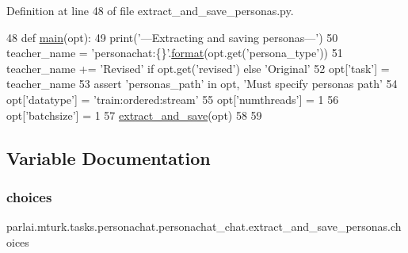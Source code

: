 Definition at line 48 of file extract\+\_\+and\+\_\+save\+\_\+personas.\+py.


\begin{DoxyCode}
48 \textcolor{keyword}{def }\hyperlink{namespacepersonachat__eval_1_1extract__and__save__personas_aa39f496bc78dfa28c1fbc2c4129a915c}{main}(opt):
49     print(\textcolor{stringliteral}{'---Extracting and saving personas---'})
50     teacher\_name = \textcolor{stringliteral}{'personachat:\{\}'}.\hyperlink{namespaceparlai_1_1chat__service_1_1services_1_1messenger_1_1shared__utils_a32e2e2022b824fbaf80c747160b52a76}{format}(opt.get(\textcolor{stringliteral}{'persona\_type'}))
51     teacher\_name += \textcolor{stringliteral}{'Revised'} \textcolor{keywordflow}{if} opt.get(\textcolor{stringliteral}{'revised'}) \textcolor{keywordflow}{else} \textcolor{stringliteral}{'Original'}
52     opt[\textcolor{stringliteral}{'task'}] = teacher\_name
53     \textcolor{keyword}{assert} \textcolor{stringliteral}{'personas\_path'} \textcolor{keywordflow}{in} opt, \textcolor{stringliteral}{'Must specify personas path'}
54     opt[\textcolor{stringliteral}{'datatype'}] = \textcolor{stringliteral}{'train:ordered:stream'}
55     opt[\textcolor{stringliteral}{'numthreads'}] = 1
56     opt[\textcolor{stringliteral}{'batchsize'}] = 1
57     \hyperlink{namespacepersonachat__eval_1_1extract__and__save__personas_a7bae99c34a0b3f49cbce1328146926fd}{extract\_and\_save}(opt)
58 
59 
\end{DoxyCode}


\subsection{Variable Documentation}
\mbox{\label{namespaceparlai_1_1mturk_1_1tasks_1_1personachat_1_1personachat__chat_1_1extract__and__save__personas_a2def58d59437334ec072a3d644c0a577}} 
\subsubsection{\texorpdfstring{choices}{choices}}
{\footnotesize\ttfamily parlai.\+mturk.\+tasks.\+personachat.\+personachat\+\_\+chat.\+extract\+\_\+and\+\_\+save\+\_\+personas.\+choices}



